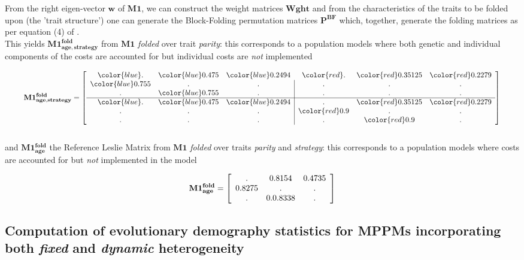 \documentclass[10pt,a4paper]{article}
\begin{document}
From the right eigen-vector $\mathbf{w}$ of $\mathbf{M1}$, we can construct the weight matrices $\mathbf{Wght}$ and from the characteristics of the traits to be folded upon (the 'trait structure') one can generate the Block-Folding permutation matrices $\mathbf{P^{BF}}$ which, together, generate the folding matrices as per equation (4) of \citep{Coste2017}.\\

This yields $\mathbf{M1^{fold}_{age,strategy}}$ from $\mathbf{M1}$ \emph{folded} over trait \emph{parity}: this corresponds to a population models where both genetic and individual components of the costs are accounted for but individual costs are \emph{not} implemented 

\[
\resizebox{!}{12mm}{
$\displaystyle 
\mathbf{M1^{fold}_{age,strategy}}=
\left[\begin{array}
{c c c| c c c }
 \color{blue} . & \color{blue}0.475& \color{blue}0.2494 &  \color{red} . & \color{red}0.35125 & \color{red}0.2279 \\
\color{blue} 0.755  & . & . & . & . & . \\
.  & \color{blue} 0.755 & . & . & . & . \\
\hline
\color{blue}. & \color{blue}0.475 & \color{blue}0.2494 & . & \color{red}0.35125 & \color{red}0.2279 \\
.  & . & . & \color{red} 0.9  & .  & . \\
.  & . & .   & . & \color{red} 0.9 & . 
\end{array}\right]
$
}
\]\\


and $\mathbf{M1^{fold}_{age}}$ the Reference Leslie Matrix from $\mathbf{M1}$ \emph{folded} over traits \emph{parity} and \emph{strategy}: this corresponds to a population models where costs are accounted for but \emph{not} implemented in the model  

\[
\resizebox{!}{7mm}{
$\displaystyle 
\mathbf{M1^{fold}_{age}}=
\left[\begin{array}
{c c c}
 . & 0.8154& 0.4735\\
0.8275  & . & . \\
.  & 0.0.8338 & . 
\end{array}\right]
$
}
\]

\subsection{Computation of evolutionary demography statistics for MPPMs incorporating both \emph{fixed} and \emph{dynamic} heterogeneity}
\end{document}
